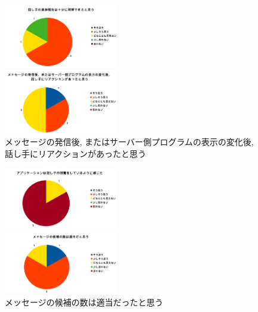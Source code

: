 \documentclass{funthesis}
\begin{document}
  \begin{figure}[H]
 \begin{minipage}{0.5\hsize}
  \begin{center}
  \includegraphics[width=50mm]{./img/question5.png}
  \end{center}
  \caption{話し手の進捗報告は十分に聞けた\newline と思う}
  \label{question5}
 \end{minipage}
 \begin{minipage}{0.5\hsize}
  \begin{center}
  \includegraphics[width=50mm]{./img/question6.png}
  \end{center}
  \caption{メッセージの発信後, またはサーバー側プログラムの表示の変化後, 話し手に\newline リアクションがあったと思う}
  \label{question6}
  \end{minipage}
  \end{figure}
  
  \begin{figure}[H]
 \begin{minipage}{0.5\hsize}
  \begin{center}
  \includegraphics[width=50mm]{./img/question7.png}
  \end{center}
  \caption{アプリケーションは話し手の邪魔\newline をしているように感じた}
  \label{question7}
 \end{minipage}
 \begin{minipage}{0.5\hsize}
  \begin{center}
  \includegraphics[width=50mm]{./img/question8.png}
  \end{center}
  \caption{メッセージの候補の数は適当だったと思う}
  \label{question8}
  \end{minipage}
  \end{figure}
\end{document}
